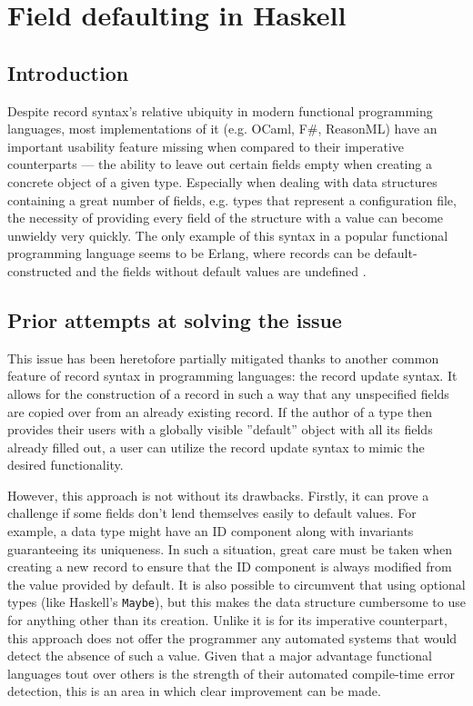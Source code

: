 \documentclass[en]{pracamgr}
\begin{document}
\section{Field defaulting in Haskell}
\subsection{Introduction}
Despite record syntax's relative ubiquity in modern functional programming languages, most implementations
of it (e.g. OCaml, F\#, ReasonML) have an important usability feature missing when compared
to their imperative counterparts --- the ability to leave out certain fields empty
when creating a concrete object of a given type. Especially when dealing with
data structures containing a great number of fields, e.g. types that represent
a configuration file, the necessity of providing every field 
of the structure with a value can become unwieldy very quickly. 
The only example of this syntax in a popular functional programming language seems to be Erlang,
where records can be default-constructed and the fields without default values are undefined \cite{ErlangRecords}.

\subsection{Prior attempts at solving the issue}
This issue has been heretofore partially mitigated thanks to another common feature of record syntax in programming languages: the record update syntax. 
It allows for the construction of a record in such a way that any unspecified fields are copied over from an already existing record. 
If the author of a type then provides their users with a globally visible ''default'' object with all its fields already filled out, a user can utilize the record update syntax to mimic the desired functionality.

However, this approach is not without its drawbacks.
Firstly, it can prove a challenge if some fields don't lend themselves easily to default values. 
For example, a data type might have an ID component along with invariants guaranteeing its uniqueness. 
In such a situation, great care must be taken when creating a new record to ensure that the ID component is always modified from the value provided by default.
It is also possible to circumvent that using optional types (like Haskell's \texttt{Maybe}), but this makes the data structure cumbersome to use for anything other than its creation.
Unlike it is for its imperative counterpart, this approach does not offer the programmer any automated systems that would detect the absence of such a value.
Given that a major advantage functional languages tout over others is the strength of their automated compile-time error detection, this is an area in which clear improvement can be made.
\end{document}
